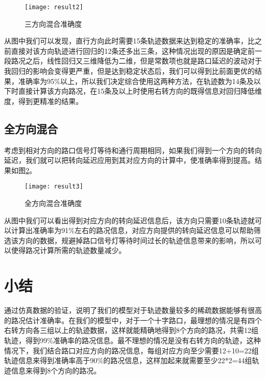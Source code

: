 \begin{figure}[H] 
  \centering
  \texttt{[image: result2]}
  \caption{三方向混合准确度}
  \label{fig:4.5}
\end{figure}

从图中我们可以发现，直行方向此时需要15条轨迹数据来达到稳定的准确率，比之前直接对该方向轨迹进行回归的12条还多出三条，这种情况出现的原因是确定前一段路况之后，线性回归又三维降低为二维，但是常数项也就是路口延迟的波动对于我回归的影响会变得更严重，但是达到稳定状态后，我们可以得到比前面更优的结果，准确率为95\%以上，所以我们决定综合使用这两种方法，在轨迹数为14条及以下时直接计算该方向路况，在15条及以上时使用右转方向的既得信息对回归降低维度，得到更精准的结果。

\subsection{全方向混合}
考虑到相对方向的路口信号灯等待和通行周期相同，如果我们得到一个方向的转向延迟，我们就可以把转向延迟应用到其对应方向的计算中，使准确率得到提高。结果如图\ref{fig:4.6}。

\begin{figure}[H] 
  \centering
  \texttt{[image: result3]}
  \caption{全方向混合准确度}
  \label{fig:4.6}
\end{figure}

从图中我们可以看出得到对应方向的转向延迟信息后，该方向只需要10条轨迹就可以计算出准确率为91\%左右的路况信息，对应方向提供的转向延迟信息可以帮助筛选该方向的数据，规避掉路口信号灯等待时间过长的轨迹信息带来的影响，所以可以使得路况计算所需的轨迹数量减少。

\section{小结}
通过仿真数据的验证，说明了我们的模型对于轨迹数量较多的稀疏数据能够有很高的路况估计准确率。在我们的模型中，对于一个十字路口，最理想的情况是有四个右转方向各三组以上的轨迹数据，这样就能精确地得到8个方向的路况，共需12组轨迹，得到99\%准确率的路况信息。最不理想的情况是没有右转方向的轨迹，这种情况下，我们结合路口对应方向的路况信息，每组对应方向至少需要12+10=22组轨迹信息来得到准确率高于90\%的路况信息，这样加起来就需要至少22*2=44组轨迹信息来得到8个方向的路况。